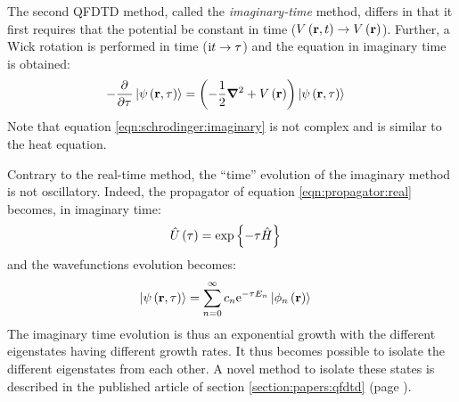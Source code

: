 The second QFDTD method, called the \textit{imaginary-time} method, differs in
that it first requires that the potential be constant in time ($V\left( \textbf{r}, t \right)
\rightarrow V\left( \textbf{r} \right)$). Further, a Wick rotation is performed in time ($\textrm{i} t
\rightarrow \tau$) and the \schrodinger equation in imaginary time is
obtained:
\begin{align}
- \frac{\partial^{{}} }{\partial {\tau}^{{}}} \left| \psi\left( \textbf{r}, \tau \right) \right>
    & = \left( -\frac{1}{2} \bm{\nabla}^2 + V\left( \textbf{r} \right)  \right) \left| \psi\left( \textbf{r}, \tau \right) \right>
\label{eqn:schrodinger:imaginary}
\end{align}
Note that equation \eqref{eqn:schrodinger:imaginary} is not complex and is
similar to the heat equation.


Contrary to the real-time method, the ``time'' evolution of the imaginary
method is not oscillatory. Indeed, the propagator of equation
\eqref{eqn:propagator:real} becomes, in imaginary time:
\begin{align}
\hat{U}\left( \tau \right) & = \exp{ \left\{  - \tau  \hat{H} \right\}} \label{eqn:propagator:imag}
\end{align}
and the wavefunctions evolution becomes:
\begin{align}
\left| \psi\left( \textbf{r}, \tau \right) \right>
 & = \sum_{n=0}^{\infty} c_n \textrm{e}^{ - \tau E_n } \left| \phi_n\left( \textbf{r} \right) \right>
\end{align}
The imaginary time evolution is thus an exponential growth with the different
eigenstates having different growth rates. It thus becomes possible to isolate
the different eigenstates from each other. A novel method to isolate these
states is described in the published article of section
\ref{section:papers:qfdtd} (page \pageref{section:papers:qfdtd}).

